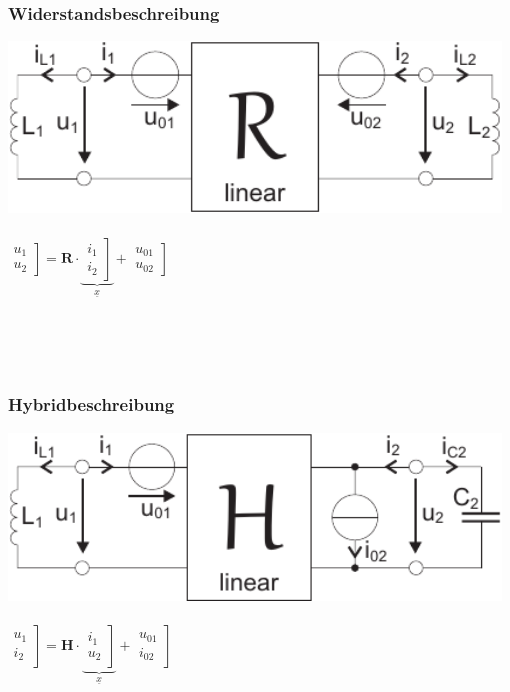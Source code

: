 \documentclass[a4paper,twocolumn,10pt]{article}
\begin{document}
\begin{minipage}[t]{0.23\textwidth}
\subsubsection*{Widerstandsbeschreibung}
\includegraphics[width=0.98\textwidth]{Grafiken/ESBzweitenGrades2}\\\\
$\left.\begin{matrix}u_1 \\ u_2\end{matrix}\right]=\textbf{R}\cdot \underbrace{\left.\begin{matrix}i_1 \\ i_2\end{matrix}\right]}_{\underline{x}}+\left.\begin{matrix}u_{01} \\ u_{02}\end{matrix}\right]$
\end{minipage}\\\\\\
\begin{minipage}[t]{0.23\textwidth}
\subsubsection*{Hybridbeschreibung}
\includegraphics[width=0.98\textwidth]{Grafiken/ESBzweitenGrades3}\\\\
$\left.\begin{matrix}u_1 \\ i_2\end{matrix}\right]=\textbf{H}\cdot \underbrace{\left.\begin{matrix}i_1 \\ u_2\end{matrix}\right]}_{\underline{x}}+\left.\begin{matrix}u_{01} \\ i_{02}\end{matrix}\right]$
\end{minipage}
\end{document}
